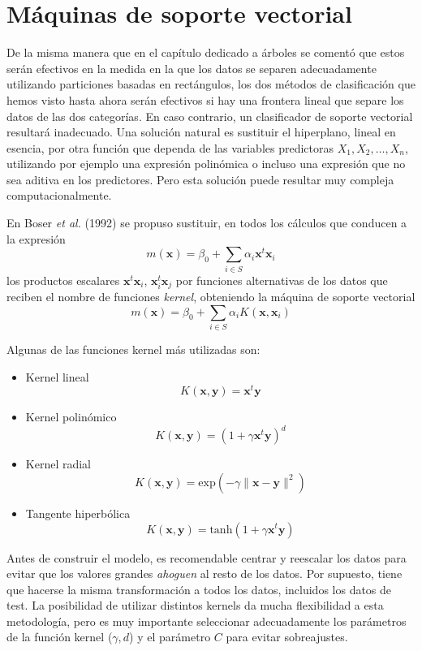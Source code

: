 \documentclass[
  spanish,
]{book}
\theoremstyle{break}
\theoremstyle{definition}
\theoremstyle{definition}
\theoremstyle{definition}
\theoremstyle{definition}
\theoremstyle{remark}
\begin{document}
\hypertarget{muxe1quinas-de-soporte-vectorial}{%
\section{Máquinas de soporte vectorial}\label{muxe1quinas-de-soporte-vectorial}}

De la misma manera que en el capítulo dedicado a árboles se comentó que estos serán efectivos en la medida en la que los datos se separen adecuadamente utilizando particiones basadas en rectángulos, los dos métodos de clasificación que hemos visto hasta ahora serán efectivos si hay una frontera lineal que separe los datos de las dos categorías. En caso contrario, un clasificador de soporte vectorial resultará inadecuado. Una solución natural es sustituir el hiperplano, lineal en esencia, por otra función que dependa de las variables predictoras \(X_1,X_2, \ldots, X_n\), utilizando por ejemplo una expresión polinómica o incluso una expresión que no sea aditiva en los predictores. Pero esta solución puede resultar muy compleja computacionalmente.

En Boser \emph{et al.} (1992) se propuso sustituir, en todos los cálculos que conducen a la expresión
\[m(\mathbf{x}) = \beta_0 + \sum_{i\in S} \alpha_i \mathbf{x}^t \mathbf{x}_i\]
los productos escalares \(\mathbf{x}^t \mathbf{x}_i\), \(\mathbf{x}_i^t \mathbf{x}_j\) por funciones alternativas de los datos que reciben el nombre de funciones \emph{kernel}, obteniendo la máquina de soporte vectorial
\[m(\mathbf{x}) = \beta_0 + \sum_{i\in S} \alpha_i K(\mathbf{x}, \mathbf{x}_i)\]

Algunas de las funciones kernel más utilizadas son:

\begin{itemize}
\item
  Kernel lineal
  \[K(\mathbf{x}, \mathbf{y}) = \mathbf{x}^t \mathbf{y}\]
\item
  Kernel polinómico
  \[K(\mathbf{x}, \mathbf{y}) = (1 + \gamma \mathbf{x}^t \mathbf{y})^d\]
\item
  Kernel radial
  \[K(\mathbf{x}, \mathbf{y}) = \mbox{exp} (-\gamma \| \mathbf{x} - \mathbf{y} \|^2)\]
\item
  Tangente hiperbólica
  \[K(\mathbf{x}, \mathbf{y}) = \mbox{tanh} (1 + \gamma \mathbf{x}^t \mathbf{y})\]
\end{itemize}

Antes de construir el modelo, es recomendable centrar y reescalar los datos para evitar que los valores grandes \emph{ahoguen} al resto de los datos. Por supuesto, tiene que hacerse la misma transformación a todos los datos, incluidos los datos de test. La posibilidad de utilizar distintos kernels da mucha flexibilidad a esta metodología, pero es muy importante seleccionar adecuadamente los parámetros de la función kernel (\(\gamma,d\)) y el parámetro \(C\) para evitar sobreajustes.
\end{document}
